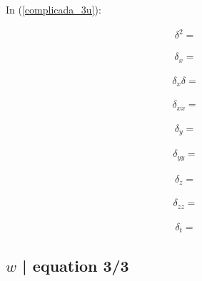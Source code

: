 \documentclass[12pt,a4paper]{article}
\begin{document}
	In (\ref{complicada_3u}):

	\begin{multline}
	  \delta^2 =
	\end{multline}

	\begin{multline}
	  \delta_x =
	\end{multline}

	\begin{multline}
	  \delta_x \delta =
	\end{multline}

	\begin{multline}
	  \delta_{xx} =
	\end{multline}

	\begin{multline}
	  \delta_y =
	\end{multline}

	\begin{multline}
	  \delta_{yy} =
	\end{multline}

	\begin{multline}
	  \delta_z =
	\end{multline}

	\begin{multline}
	  \delta_{zz} =
	\end{multline}

	\begin{multline}
	  \delta_t =
	\end{multline}

\subsection{$w$ | equation 3/3}
\end{document}
